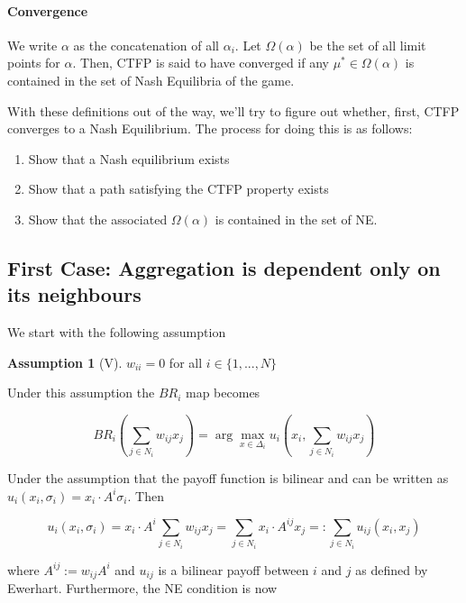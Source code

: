 \documentclass{article}
\theoremstyle{definition}
\newtheorem*{assumption}{Assumption}
\begin{document}
	\paragraph{Convergence} We write $\alpha$ as the concatenation of all $\alpha_i$. Let $\Omega(\alpha)$ be  the set of all limit points for $\alpha$. Then, CTFP is said to have converged if any $\mu^* \in \Omega(\alpha)$ is contained in the set of Nash Equilibria of the game.
	
	With these definitions out of the way, we'll try to figure out whether, first, CTFP converges to a Nash Equilibrium. The process for doing this is as follows:
	
	\begin{enumerate}
		\item Show that a Nash equilibrium exists
		\item Show that a path satisfying the CTFP property exists
		\item Show that the associated $\Omega(\alpha)$ is contained in the set of NE.

	\end{enumerate}
	
	\subsection*{First Case: Aggregation is dependent only on its neighbours}
	
	We start with the following assumption
	
	\begin{assumption}[V]
	$w_{ii} = 0$ for all $i \in \{ 1, ..., N \}$
	\end{assumption}
	
	Under this assumption the $BR_i$ map becomes
	
	\begin{equation}
		BR_i(\sum_{j \in N_i} w_{ij} x_j) = \arg\max_{x \in \Delta_i} u_i(x_i,\sum_{j \in N_i} w_{ij} x_j)
	\end{equation}
	
	Under the assumption that the payoff function is bilinear and can be written as $u_i(x_i, \sigma_i) = x_i \cdot A^i \sigma_i$. Then 
	
	\begin{equation*}
		u_i(x_i, \sigma_i) = x_i \cdot A^i \sum_{j \in N_i} w_{ij} x_j = \sum_{j \in N_i} x_i \cdot A^{ij} x_j =: \sum_{j \in N_i} u_{ij}(x_i, x_j) 
	\end{equation*}
	
	where $A^{ij} := w_{ij} A^i$ and $u_{ij}$ is a bilinear payoff between $i$ and $j$ as defined by Ewerhart. Furthermore, the NE condition is now
	
\end{document}

